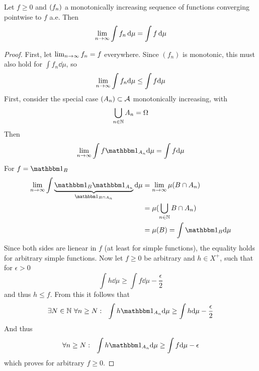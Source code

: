 \documentclass[../../script.tex]{subfiles}
\begin{document}
\begin{thm}
    Let $f \ge 0$ and $\seq{f}$ a monotonically increasing sequence of functions converging pointwise to $f$ a.e.
    Then 
    \[
        \limn \int f_n \dd{\mu} = \int f \dd{\mu}
    \]
\end{thm}
\begin{proof}
    First, let $\limn f_n = f$ everywhere. Since $(f_n)$ is monotonic, this must also hold for $\int f_n \dd{\mu}$, so 
    \begin{equation}
        \limn \int f_n \dd\mu \le \int f \dd\mu
    \end{equation}
    First, consider the special case $\anyseqdef[A]{\setfam}$ monotonically increasing, with 
    \begin{equation}
        \bigcup_{n \in \natn} A_n = \Omega
    \end{equation}
    Then 
    \begin{equation}\label{eq:750}
        \limn \int f \charfun_{A_n} \dd\mu = \int f \dd\mu 
    \end{equation}
    For $f = \charfun_B$
    \begin{equation}
        \begin{split}
            \limn \int \underbrace{\charfun_B \charfun_{A_n}}_{\charfun_{B \cap A_n}} \dd\mu &= \limn \mu(B \cap A_n) \\
            &= \mu(\bigcup_{n \in \natn} B \cap A_n) \\
            &= \mu(B) = \int \charfun_B \dd\mu
        \end{split}
    \end{equation}
    Since both sides are lienear in $f$ (at least for simple functions), the equality holds for arbitrary simple functions.
    Now let $f \ge 0$ be arbitrary and $h \in X^+$, such that for $\epsilon > 0$
    \begin{equation}
        \int h \dd\mu \ge \int f \dd\mu - \frac{\epsilon}{2}
    \end{equation}
    and thus $h \le f$. From this it follows that 
    \begin{equation}
        \exists N \in \natn ~\forall n \ge N: ~~\int h \charfun_{A_n} \dd\mu \ge \int h \dd\mu - \frac{\epsilon}{2}
    \end{equation}
    And thus 
    \begin{equation}
        \forall n \ge N: ~~\int h \charfun_{A_n} \dd\mu \ge \int f \dd\mu - \epsilon
    \end{equation}
    which proves  for arbitrary $f \ge 0$. 

\end{proof}
\end{document}
